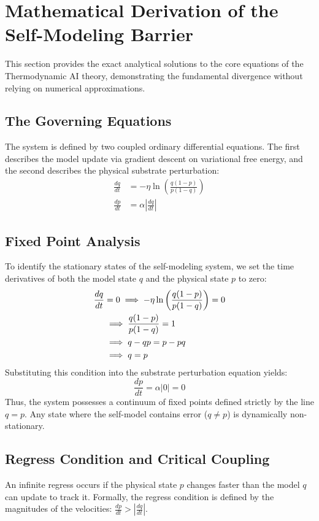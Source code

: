 \documentclass[12pt]{article}
\begin{document}
\section{Mathematical Derivation of the Self-Modeling Barrier}

This section provides the exact analytical solutions to the core equations of the Thermodynamic AI theory, demonstrating the fundamental divergence without relying on numerical approximations.

\subsection{The Governing Equations}
The system is defined by two coupled ordinary differential equations. The first describes the model update via gradient descent on variational free energy, and the second describes the physical substrate perturbation:
\begin{align}
    \frac{dq}{dt} &= -\eta \ln\left( \frac{q(1-p)}{p(1-q)} \right) \\
    \frac{dp}{dt} &= \alpha \left| \frac{dq}{dt} \right|
\end{align}

\subsection{Fixed Point Analysis}
To identify the stationary states of the self-modeling system, we set the time derivatives of both the model state $q$ and the physical state $p$ to zero:
\begin{align}
    \frac{dq}{dt} &= 0 \implies -\eta \ln\left( \frac{q(1-p)}{p(1-q)} \right) = 0 \notag \\
    &\implies \frac{q(1-p)}{p(1-q)} = 1 \notag \\
    &\implies q - qp = p - pq \notag \\
    &\implies q = p
\end{align}
Substituting this condition into the substrate perturbation equation yields:
\begin{equation}
    \frac{dp}{dt} = \alpha \left| 0 \right| = 0
\end{equation}
Thus, the system possesses a continuum of fixed points defined strictly by the line $q=p$. Any state where the self-model contains error ($q \neq p$) is dynamically non-stationary.

\subsection{Regress Condition and Critical Coupling}
An infinite regress occurs if the physical state $p$ changes faster than the model $q$ can update to track it. Formally, the regress condition is defined by the magnitudes of the velocities: $\frac{dp}{dt} > \left|\frac{dq}{dt}\right|$.
\end{document}
